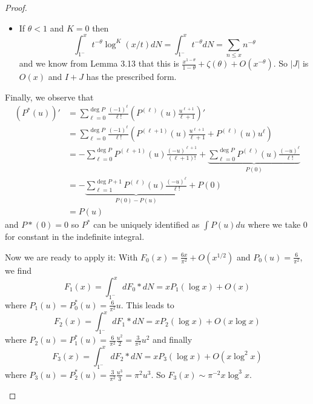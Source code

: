 \documentclass[12pt]{article}
\begin{document}
\begin{proof}
\begin{enumerate}
\begin{itemize}
\item If $\theta < 1$ and $K = 0$ then
$$\int_{1^-}^x t^{-\theta} \log^K(x/t) dN = \int_{1^-}^x t^{-\theta} dN = \sum_{n \leq x} n^{-\theta}$$
and we know from Lemma 3.13 that this is $\frac{x^{1-\theta}}{1 - \theta} + \zeta(\theta) + O(x^{-\theta})$. So $|J|$ is $O(x)$ and $I + J$ has the prescribed form.
\end{itemize}
Finally, we observe that
\begin{align*}
(P^*(u))' &= \sum_{\ell = 0}^{\deg P} \frac{(-1)^\ell}{\ell!} \left( P^{(\ell)}(u) \frac{u^{\ell + 1}}{\ell + 1} \right)' \\
&= \sum_{\ell = 0}^{\deg P} \frac{(-1)^\ell}{\ell!} \left( P^{(\ell + 1)}(u) \frac{u^{\ell + 1}}{\ell + 1} + P^{(\ell)}(u) u^\ell \right)\\
&= -\sum_{\ell = 0}^{\deg P} P^{(\ell + 1)}(u) \frac{(-u)^{\ell + 1}}{(\ell + 1)!} + \underbrace{\sum_{\ell = 0}^{\deg P} P^{(\ell)}(u) \frac{(-u)^\ell}{\ell!}}_{P(0)}\\
&= - \underbrace{\sum_{\ell = 1}^{\deg P + 1} P^{(\ell)}(u) \frac{(-u)^{\ell}}{\ell!}}_{P(0) - P(u)} + P(0)\\
&= P(u)
\end{align*}
and $P*(0) = 0$ so $P^*$ can be uniquely identified as $\int P(u) du$ where we take 0 for constant in the indefinite integral.

Now we are ready to apply it: With $F_0(x) = \frac{6x}{\pi^2} + O(x^{1/2})$ and $P_0(u) = \frac{6}{\pi^2}$, we find
$$F_1(x) = \int_{1^-}^x dF_0 * dN = x P_1(\log x) + O(x)$$
where $P_1(u) = P_0^*(u) = \frac{6}{\pi^2} u$. This leads to
$$F_2(x) = \int_{1^-}^x dF_1 * dN = x P_2(\log x) + O(x \log x)$$
where $P_2(u) = P_1^*(u) = \frac{6}{\pi^2} \frac{u^2}{2} = \frac{3}{\pi^2} u^2$ and finally
$$F_3(x) = \int_{1^-}^x dF_2 * dN = x P_3(\log x) + O(x \log^2 x)$$
where $P_3(u) = P_2^*(u) = \frac{3}{\pi^2} \frac{u^3}{3} = \pi^2 u^3$. So $F_3(x) \sim \pi^{-2} x \log^3 x$.
\end{enumerate}
\end{proof}

\unless\ifdefined\IsMainDocument
\end{document}
